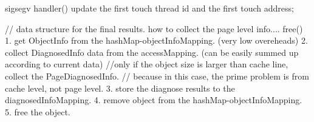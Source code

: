 
        sigsegv handler() {
            update the first touch thread id and the first touch address;
        }

        // data structure for the final results. how to collect the page level info....
        free() {
            1. get ObjectInfo from the hashMap-objectInfoMapping. (very low overeheads)
            2. collect DiagnosedInfo data from the accessMapping. (can be easily summed up according to current data)
            //only if the object size is larger than cache line, collect the PageDiagnosedInfo.
            // because in this case, the prime problem is from cache level, not page level.
            3. store the diagnose results to the diagnosedInfoMapping.
            4. remove object from the hashMap-objectInfoMapping.
            5. free the object.
        }
